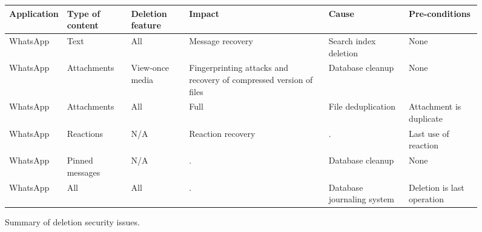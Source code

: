 \begin{figure}[t!]
    \centering
    \begin{tabular}{l|lllll}
     \toprule
     \textbf{Application} & \textbf{Type of content} & \textbf{Deletion feature} & \textbf{Impact} & \textbf{Cause} & \textbf{Pre-conditions}\\ 
     \midrule
    WhatsApp & Text & All & Message recovery & Search index deletion & None \\
    WhatsApp & Attachments & View-once media & Fingerprinting attacks and recovery of compressed version of files & Database cleanup & None \\
    WhatsApp & Attachments & All & Full & File deduplication & Attachment is duplicate \\
    WhatsApp & Reactions & N/A & Reaction recovery & . &  Last use of reaction \\
    WhatsApp & Pinned messages & N/A & . & Database cleanup & None \\
    WhatsApp & All & All & . & Database journaling system & Deletion is last operation \\
    \bottomrule
\end{tabular}
\caption{Summary of deletion security issues.}\label{fig:vulnerabilities-summary}
\end{figure}